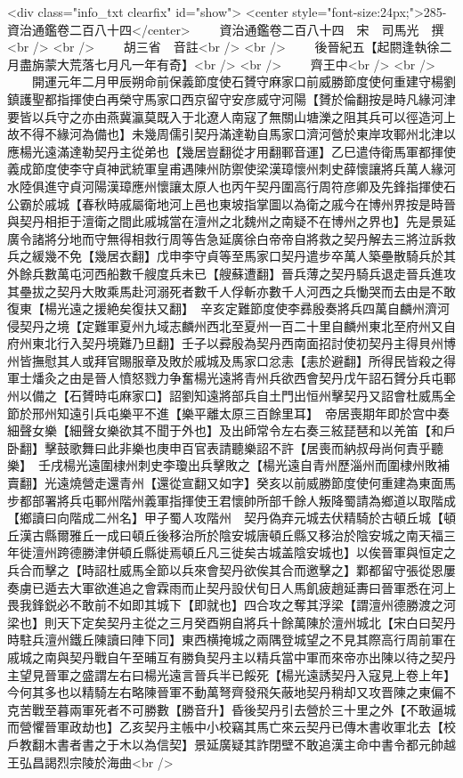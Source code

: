 <div class="info_txt clearfix" id="show">
<center style="font-size:24px;">285-資治通鑑卷二百八十四</center>
  　　資治通鑑卷二百八十四　宋　司馬光　撰<br />
<br />
　　胡三省　音註<br />
<br />
　　後晉紀五【起閼逢執徐二月盡旃蒙大荒落七月凡一年有奇】<br />
<br />
　　齊王中<br />
<br />
　　開運元年二月甲辰朔命前保義節度使石贇守麻家口前威勝節度使何重建守楊劉鎮護聖都指揮使白再榮守馬家口西京留守安彦威守河陽【贇於倫翻按是時凡緣河津要皆以兵守之亦由燕冀瀛莫既入于北遼人南寇了無關山塘濼之阻其兵可以徑造河上故不得不緣河為備也】未幾周儒引契丹滿達勒自馬家口濟河營於東岸攻鄆州北津以應楊光遠滿達勒契丹主從弟也【幾居豈翻從才用翻鄆音運】乙巳遣侍衛馬軍都揮使義成節度使李守貞神武統軍皇甫遇陳州防禦使梁漢璋懷州刺史薛懷讓將兵萬人緣河水陸俱進守貞河陽漢璋應州懷讓太原人也丙午契丹圍高行周符彦卿及先鋒指揮使石公霸於戚城【春秋時戚屬衛地河上邑也東坡指掌圖以為衛之戚今在博州界按是時晉與契丹相拒于澶衛之間此戚城當在澶州之北魏州之南疑不在博州之界也】先是景延廣令諸將分地而守無得相救行周等告急延廣徐白帝帝自將救之契丹解去三將泣訴救兵之緩幾不免【幾居衣翻】戊申李守貞等至馬家口契丹遣步卒萬人築壘散騎兵於其外餘兵數萬屯河西船數千艘度兵未已【艘蘇遭翻】晉兵薄之契丹騎兵退走晉兵進攻其壘拔之契丹大敗乘馬赴河溺死者數千人俘斬亦數千人河西之兵慟哭而去由是不敢復東【楊光遠之援絶矣復扶又翻】　辛亥定難節度使李彞殷奏將兵四萬自麟州濟河侵契丹之境【定難軍夏州九域志麟州西北至夏州一百二十里自麟州東北至府州又自府州東北行入契丹境難乃旦翻】壬子以彛殷為契丹西南面招討使初契丹主得貝州博州皆撫慰其人或拜官賜服章及敗於戚城及馬家口忿恚【恚於避翻】所得民皆殺之得軍士燔灸之由是晉人憤怒戮力争奮楊光遠將青州兵欲西會契丹戊午詔石贇分兵屯鄆州以備之【石贇時屯麻家口】詔劉知遠將部兵自土門出恒州擊契丹又詔會杜威馬全節於邢州知遠引兵屯樂平不進【樂平離太原三百餘里耳】　帝居喪期年即於宫中奏細聲女樂【細聲女樂欲其不聞于外也】及出師常令左右奏三絃琵琶和以羌笛【和戶卧翻】擊鼓歌舞曰此非樂也庚申百官表請聽樂詔不許【居喪而納叔母尚何責乎聽樂】　壬戌楊光遠圍棣州刺史李瓊出兵擊敗之【楊光遠自青州歷淄州而圍棣州敗補賣翻】光遠燒營走還青州【還從宣翻又如字】癸亥以前威勝節度使何重建為東面馬步都部署將兵屯鄆州階州義軍指揮使王君懷帥所部千餘人叛降蜀請為鄉道以取階成【鄉讀曰向階成二州名】甲子蜀人攻階州　契丹偽弃元城去伏精騎於古頓丘城【頓丘漢古縣爾雅丘一成曰頓丘後移治所於陰安城唐頓丘縣又移治於陰安城之南天福三年徙澶州跨德勝津併頓丘縣徙焉頓丘凡三徙矣古城盖陰安城也】以俟晉軍與恒定之兵合而擊之【時詔杜威馬全節以兵來會契丹欲俟其合而邀擊之】鄴都留守張從恩屢奏虜已遁去大軍欲進追之會霖雨而止契丹設伏旬日人馬飢疲趙延夀曰晉軍悉在河上畏我鋒鋭必不敢前不如即其城下【即就也】四合攻之奪其浮梁【謂澶州德勝渡之河梁也】則天下定矣契丹主從之三月癸酉朔自將兵十餘萬陳於澶州城北【宋白曰契丹時駐兵澶州鐵丘陳讀曰陣下同】東西横掩城之兩隅登城望之不見其際高行周前軍在戚城之南與契丹戰自午至晡互有勝負契丹主以精兵當中軍而來帝亦出陳以待之契丹主望見晉軍之盛謂左右曰楊光遠言晉兵半已餒死【楊光遠誘契丹入寇見上卷上年】今何其多也以精騎左右略陳晉軍不動萬弩齊發飛矢蔽地契丹稍却又攻晋陳之東偏不克苦戰至暮兩軍死者不可勝數【勝音升】昏後契丹引去營於三十里之外【不敢逼城而營懼晉軍政劫也】乙亥契丹主帳中小校竊其馬亡來云契丹已傳木書收軍北去【校戶教翻木書者書之于木以為信契】景延廣疑其詐閉壁不敢追漢主命中書令都元帥越王弘昌謁烈宗陵於海曲<br />
